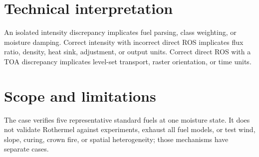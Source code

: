 \section{Technical interpretation}
An isolated intensity discrepancy implicates fuel parsing, class weighting, or moisture damping.  Correct intensity with incorrect direct ROS implicates flux ratio, density, heat sink, adjustment, or output units.  Correct direct ROS with a TOA discrepancy implicates level-set transport, raster orientation, or time units.

\section{Scope and limitations}
The case verifies five representative standard fuels at one moisture state.  It does not validate Rothermel against experiments, exhaust all fuel models, or test wind, slope, curing, crown fire, or spatial heterogeneity; those mechanisms have separate cases.
